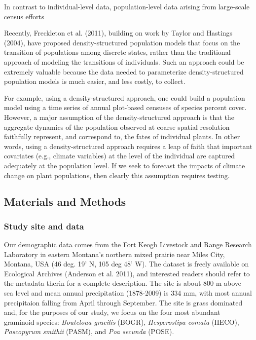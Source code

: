 \documentclass[12pt,]{article}
\begin{document}
In contrast to individual-level data, population-level data arising from
large-scale census efforts

Recently, Freckleton et al. (2011), building on work by Taylor and
Hastings (2004), have proposed density-structured population models that
focus on the transition of populations among discrete states, rather
than the traditional approach of modeling the transitions of
individuals. Such an approach could be extremely valuable because the
data needed to parameterize density-structured population models is much
easier, and less costly, to collect.

For example, using a density-structured approach, one could build a
population model using a time series of annual plot-based censuses of
species percent cover. However, a major assumption of the
density-structured approach is that the aggregate dynamics of the
population observed at coarse spatial resolution faithfully represent,
and correspond to, the fates of individual plants. In other words, using
a density-structured approach requires a leap of faith that important
covariates (e.g., climate variables) at the level of the individual are
captured adequately at the population level. If we seek to forecast the
impacts of climate change on plant populations, then clearly this
assumption requires testing.

\subsection{Materials and Methods}\label{materials-and-methods}

\subsubsection{Study site and data}\label{study-site-and-data}

Our demographic data comes from the Fort Keogh Livestock and Range
Research Laboratory in eastern Montana's northern mixed prairie near
Miles City, Montana, USA (46 deg. 19' N, 105 deg 48' W). The dataset is
freely available on Ecological Archives (Anderson et al. 2011), and
interested readers should refer to the metadata therin for a complete
description. The site is about 800 m above sea level and mean annual
precipitation (1878-2009) is 334 mm, with most annual precipitaion
falling from April through September. The site is grass dominated and,
for the purposes of our study, we focus on the four most abundant
graminoid species: \emph{Bouteloua gracilis} (BOGR),
\emph{Hesperostipa comata} (HECO), \emph{Pascopyrum smithii} (PASM), and
\emph{Poa secunda} (POSE).
\end{document}
